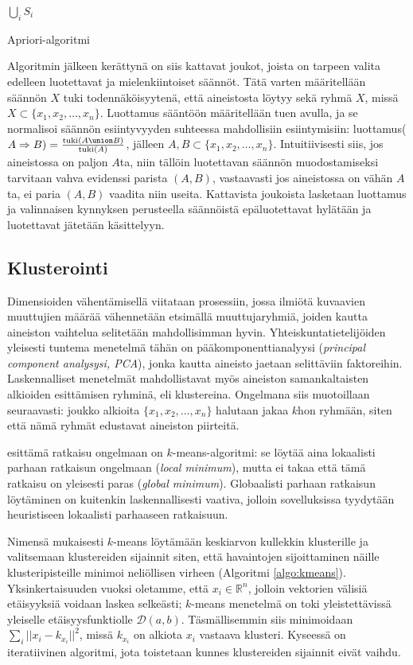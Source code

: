 \documentclass[finnish,gradu,twoside,12pt]{tktltiki}
\begin{document}
{\begin{algorithm}
\begin{algorithmic}
\Return $\bigcup_i S_i$
\end{algorithmic}
\caption{Apriori-algoritmi}
\label{algo:apriori}
\end{algorithm}

Algoritmin jälkeen kerättynä on siis kattavat joukot, joista on tarpeen valita edelleen luotettavat ja mielenkiintoiset säännöt. Tätä varten määritellään säännön $X$ tuki todennäköisyytenä, että aineistosta löytyy sekä ryhmä $X$, missä $X \subset \{ x_1, x_2, \ldots , x_n \}$. Luottamus sääntöön määritellään tuen avulla, ja se normalisoi säännön esiintyvyyden suhteessa mahdollisiin esiintymisiin: luottamus($A \Rightarrow B) = \frac{\mathrm{tuki}(A \union B)}{\mathrm{tuki}(A)}$, jälleen $A,B \subset \{ x_1, x_2, \ldots , x_n \}$. Intuitiivisesti siis, jos aineistossa on paljon $A$ta, niin tällöin luotettavan säännön muodostamiseksi tarvitaan vahva evidenssi parista $(A,B)$, vastaavasti jos aineistossa on vähän $A$ta, ei paria $(A,B)$ vaadita niin useita. Kattavista joukoista lasketaan luottamus ja valinnaisen kynnyksen perusteella säännöistä epäluotettavat hylätään ja luotettavat jätetään käsittelyyn.

\subsection{Klusterointi}

Dimensioiden vähentämisellä viitataan prosessiin, jossa ilmiötä kuvaavien muuttujien määrää vähennetään etsimällä muuttujaryhmiä, joiden kautta aineiston vaihtelua selitetään mahdollisimman hyvin. Yhteiskuntatietelijöiden yleisesti tuntema menetelmä tähän on pääkomponenttianalyysi (\textit{principal component analysysi, PCA}), jonka kautta aineisto jaetaan selittäviin faktoreihin. Laskennalliset menetelmät mahdollistavat myös aineiston samankaltaisten alkioiden esittämisen ryhminä, eli klustereina. Ongelmana siis muotoillaan seuraavasti: joukko alkioita $\{ x_1, x_2, \ldots, x_n \}$ halutaan jakaa $k$hon ryhmään, siten että nämä ryhmät edustavat aineiston piirteitä.

\citet{llyod1982} esittämä ratkaisu ongelmaan on $k$-means-algoritmi: se löytää aina lokaalisti parhaan ratkaisun ongelmaan (\textit{local minimum}), mutta ei takaa että tämä ratkaisu on yleisesti paras (\textit{global minimum}). Globaalisti parhaan ratkaisun löytäminen on kuitenkin laskennallisesti vaativa, jolloin sovelluksissa tyydytään heuristiseen lokaalisti parhaaseen ratkaisuun.

Nimensä mukaisesti $k$-means löytämään keskiarvon kullekkin klusterille ja valitsemaan klustereiden sijainnit siten, että havaintojen sijoittaminen näille klusteripisteille minimoi neliöllisen virheen (Algoritmi \ref{algo:kmeans}). Yksinkertaisuuden vuoksi oletamme, että $x_i \in \mathbb{R}^n$, jolloin vektorien välisiä etäisyyksiä voidaan laskea selkeästi; $k$-means menetelmä on toki yleistettävissä yleiselle etäisyysfunktiolle $\mathcal{D}(a,b)$. Täsmällisemmin siis minimoidaan $\sum_i ||x_i - k_{x_i}||^2$, missä $k_{x_i}$ on alkiota $x_i$ vastaava klusteri. Kyseessä on iteratiivinen algoritmi, jota toistetaan kunnes klustereiden sijainnit eivät vaihdu.

}
\end{document}
